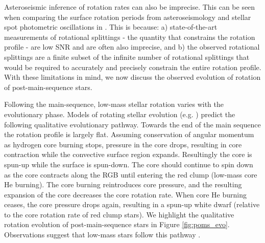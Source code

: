Asteroseismic inference of rotation rates can also be imprecise.
This can be seen when comparing the surface rotation periods from asteroseismology and stellar spot photometric oscillations in \citet{hall_weakened_2021}.
This is because: a) state-of-the-art measurements of rotational splittings - the quantity that constrains the rotation profile - are low SNR and are often also imprecise, and b) the observed rotational splittings are a finite subset of the infinite number of rotational splittings that would be required to accurately and precisely constrain the entire rotation profile.
With these limitations in mind, we now discuss the observed evolution of rotation of post-main-sequence stars.

Following the main-sequence, low-mass stellar rotation varies with the evolutionary phase.
Models of rotating stellar evolution (e.g. )\citep{maeder_evolution_2000,heger_presupernova_2000} predict the following qualitative evolutionary pathway.
Towards the end of the main sequence the rotation profile is largely flat.
Assuming conservation of angular momentum as hydrogen core burning stops, pressure in the core drops, resulting in core contraction while the convective surface region expands.
Resultingly the core is spun-up while the surface is spun-down.
The core should continue to spin down as the core contracts along the RGB until entering the red clump (low-mass core He burning).
The core burning reintroduces core pressure, and the resulting expansion of the core decreases the core rotation rate.
When core He burning ceases, the core pressure drops again, resulting in a spun-up white dwarf (relative to the core rotation rate of red clump stars).
We highlight the qualitative rotation evolution of post-main-sequence stars in Figure \ref{fig:poms_evo}.
Observations suggest that low-mass stars follow this pathway \citep{mosser_spin_2012,deheuvels_seismic_2014,deheuvels_seismic_2015,hermes_white_2017,gehan_core_2018,deheuvels_seismic_2020}.

